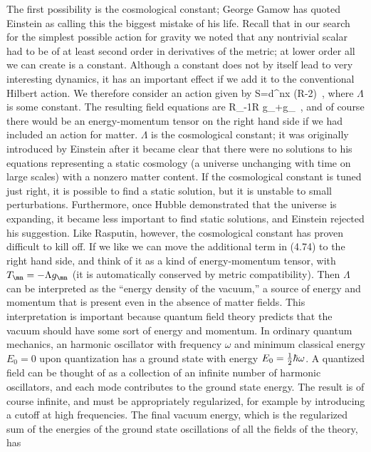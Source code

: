 The first possibility is the cosmological constant; George Gamow
has quoted Einstein as calling this the biggest mistake of his
life.  Recall that in our search for the simplest possible action
for gravity we noted that any nontrivial scalar had to be of at
least second order in derivatives of the metric; at lower order all
we can create is a constant.  Although a constant does not by itself
lead to very interesting dynamics, it has an important effect if we
add it to the conventional Hilbert action.  We therefore consider
an action given by
\be
  S=\int d^nx \g(R-2\Lambda)\ ,\label{4.73}
\ee
where $\Lambda$ is some constant.  The resulting field equations 
are 
\be
  R_\mn -{1}R g_\mn +\Lambda g_\ ,\label{4.74}
\ee
and of course there would be an energy-momentum tensor on the
right hand side if we had included an action for matter.  $\Lambda$
is the cosmological constant; it was originally introduced by 
Einstein after it became clear that there were no solutions to his
equations representing a static cosmology (a universe unchanging
with time on large scales) with a nonzero matter content.  If the
cosmological constant is tuned just right, it is possible to find
a static solution, but it is unstable to small perturbations.
Furthermore, once Hubble demonstrated that the universe is expanding,
it became less important to find static solutions, and Einstein
rejected his suggestion.  Like Rasputin, however, the cosmological
constant has proven difficult to kill off.  If we like we can move
the additional term in (4.74) to the right hand side, and think
of it as a kind of energy-momentum tensor, with $T_\mn = -
\Lambda g_\mn$ (it is automatically conserved by metric compatibility).
Then $\Lambda$ can be interpreted as the ``energy density of the
vacuum,'' a source of energy and momentum that is present even in
the absence of matter fields.  This interpretation is important because
quantum field theory predicts that the vacuum should have some sort
of energy and momentum.  In ordinary quantum mechanics, an harmonic
oscillator with frequency $\omega$ and minimum classical energy
$E_0=0$ upon quantization has a ground state with energy
$E_0={1\over 2}\hbar\omega$.  A quantized field can be thought of
as a collection of an infinite number of harmonic oscillators, and
each mode contributes to the ground state energy.  The result is
of course infinite, and must be appropriately regularized, for 
example by introducing a cutoff at high frequencies.  The final
vacuum energy, which is the regularized sum of the energies of
the ground state oscillations of all the fields of the theory, has
